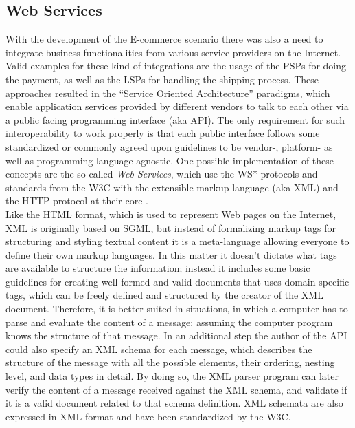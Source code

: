 
\subsection{Web Services}
\label{subsec:web_services}

With the development of the \gls{E-commerce} scenario there was also a need to integrate business functionalities from various service providers on the Internet. Valid examples for these kind of integrations are the usage of the \gls{PSP}s for doing the payment, as well as the \gls{LSP}s for handling the shipping process. These approaches resulted in the ``Service Oriented Architecture'' paradigms, which enable application services provided by different vendors to talk to each other via a public facing programming interface (aka \gls{API}). The only requirement for such interoperability to work properly is that each public interface follows some standardized or commonly agreed upon guidelines to be vendor-, platform- as well as programming language-agnostic. One possible implementation of these concepts are the so-called \emph{Web Services}, which use the WS* protocols and standards from the \gls{W3C} with the extensible markup language (aka \gls{XML}) and the \gls{HTTP} protocol at their core \citep{josuttis2007soa}. \\

Like the \gls{HTML} format, which is used to represent Web pages on the Internet, \gls{XML} is originally based on \gls{SGML}, but instead of formalizing markup tags for structuring and styling textual content it is a meta-language allowing everyone to define their own markup languages. In this matter it doesn’t dictate what tags are available to structure the information; instead it includes some basic guidelines for creating well-formed and valid documents that uses domain-specific tags, which can be freely defined and structured by the creator of the \gls{XML} document. Therefore, it is better suited in situations, in which a computer has to parse and evaluate the content of a message; assuming the computer program knows the structure of that message. In an additional step the author of the \gls{API} could also specify an \gls{XML} schema for each message, which describes the structure of the message with all the possible elements, their ordering, nesting level, and data types in detail. By doing so, the \gls{XML} parser program can later verify the content of a message received against the \gls{XML} schema, and validate if it is a valid document related to that schema definition. \gls{XML} schemata are also expressed in \gls{XML} format and have been standardized by the \gls{W3C}. \\


